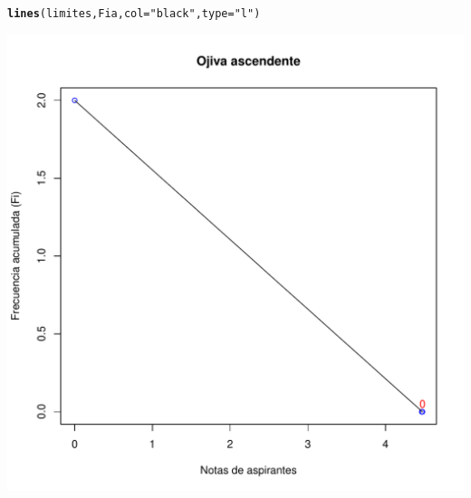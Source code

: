 \documentclass[12pt,letterpaper]{article}\usepackage[]{graphicx}\usepackage[]{color}
\makeatletter
\def\maxwidth{ %
  \ifdim\Gin@nat@width>\linewidth
    \linewidth
  \else
    \Gin@nat@width
  \fi
}
\newcommand{\hlstr}[1]{\textcolor[rgb]{0.192,0.494,0.8}{#1}}%
\newcommand{\hlstd}[1]{\textcolor[rgb]{0.345,0.345,0.345}{#1}}%
\newcommand{\hlkwc}[1]{\textcolor[rgb]{0.333,0.667,0.333}{#1}}%
\newcommand{\hlkwd}[1]{\textcolor[rgb]{0.737,0.353,0.396}{\textbf{#1}}}%
\newenvironment{kframe}{%
 \def\at@end@of@kframe{}%
 \ifinner\ifhmode%
  \def\at@end@of@kframe{\end{minipage}}%
  \begin{minipage}{\columnwidth}%
 \fi\fi%
 \def\FrameCommand##1{\hskip\@totalleftmargin \hskip-\fboxsep
 \colorbox{shadecolor}{##1}\hskip-\fboxsep
     \hskip-\linewidth \hskip-\@totalleftmargin \hskip\columnwidth}%
 \MakeFramed {\advance\hsize-\width
   \@totalleftmargin\z@ \linewidth\hsize
   \@setminipage}}%
 {\par\unskip\endMakeFramed%
 \at@end@of@kframe}
\newenvironment{knitrout}{}{} %
\makeatother
\begin{document}
\begin{enumerate}
\begin{knitrout}
\begin{kframe}
{\ttfamily\noindent\bfseries{}}\begin{alltt}
\hlkwd{lines}\hlstd{(limites, Fia,} \hlkwc{col}\hlstd{=}\hlstr{"black"}\hlstd{,} \hlkwc{type}\hlstd{=}\hlstr{"l"}\hlstd{)}
\end{alltt}
\end{kframe}
\includegraphics[width=\maxwidth]{figure/unnamed-chunk-23-1} 

\end{knitrout}


\end{enumerate}
\end{document}
